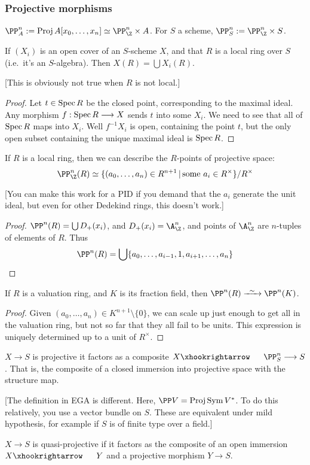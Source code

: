 \documentclass[11pt]{article}
\begin{document}
\begin{Oct20}
\subsubsection*{Projective morphisms}
\begin{defn*}
$\PP^n_A:=\proj A[x_0,\ldots,x_n]\simeq \PP^n_\Z\times A$. For $S$ a scheme, $\PP^n_S:= \PP^n_\Z\times S$.
\end{defn*}
\begin{lem*}
If $(X_i)$ is an open cover of an $S$-scheme $X$, and that $R$ is a local ring over $S$ (i.e.\ it's an $S$-algebra). Then $X(R)=\bigcup X_i(R)$.
\end{lem*}
[This is obviously not true when $R$ is not local.]
\begin{proof}
Let $t\in\operatorname{Spec} R$ be the closed point, corresponding to the maximal ideal. Any morphism $f:\operatorname{Spec} R\longrightarrow X$ sends $t$ into some $X_i$. We need to see that all of $\operatorname{Spec} R$ maps into $X_i$. Well $f^{-1}X_i$ is open, containing the point $t$, but the only open subset containing the unique maximal ideal is $\operatorname{Spec} R$.
\end{proof}
\begin{cor*}
If $R$ is a local ring, then we can describe the $R$-points of projective space:
\[\PP^n_\Z(R)\simeq\{(a_0,\ldots,a_n)\in R^{n+1}\,|\,\text{some $a_i\in R^\times$}\}/R^\times\]
\end{cor*}
[You can make this work for a PID if you demand that the $a_i$ generate the unit ideal, but even for other Dedekind rings, this doesn't work.]
\begin{proof}
$\PP^n(R)=\bigcup D_+(x_i)$, and $D_+(x_i)=\A^n_\Z$, and points of $\A^n_\Z$ are $n$-tuples of elements of $R$. Thus 
\[\PP^n(R)=\bigcup \{a_0,\ldots,a_{i-1},1,a_{i+1},\ldots,a_n\}\qedhere\]
\end{proof}
\begin{cor*}
If $R$ is a valuation ring, and $K$ is its fraction field, then $\PP^n(R)\weakequiv \PP^n(K)$.
\end{cor*}
\begin{proof}
Given $(a_0,\ldots,a_n)\in K^{n+1}\setminus\{0\}$, we can scale up just enough to get all in the valuation ring, but not so far that they all fail to be units. This expression is uniquely determined up to a unit of $R^\times$.
\end{proof}
\begin{defn*}
$X\to S$ is projective \Iff it factors as a composite $X\cofibration \PP^n_S\to S$. That is, the composite of a closed immersion into projective space with the structure map.
\end{defn*}
[The definition in EGA is different. Here, $\PP V=\proj\Sym V^*$. To do this relatively, you use a vector bundle on $S$. These are equivalent under mild hypothesis, for example if $S$ is of finite type over a field.]
\begin{defn*}
$X\to S$ is quasi-projective if it factors as the composite of an open immersion $X\cofibration Y$ and a projective morphism $Y\to S$.
\end{defn*}

\end{Oct20}
\end{document}
